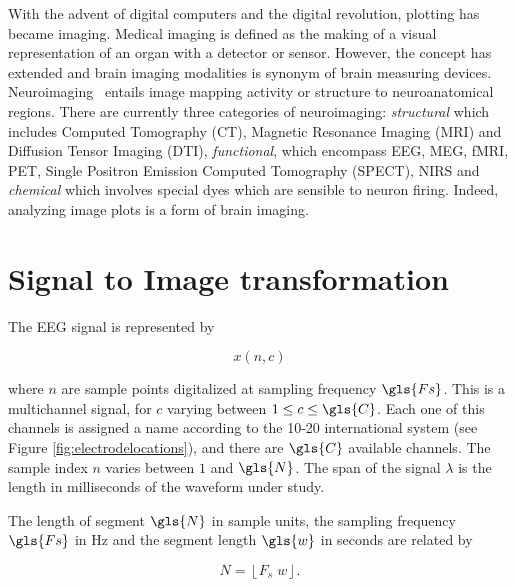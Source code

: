 
\begin{story}[Neuroimaging]
With the advent of digital computers and the digital revolution, plotting has became imaging.  Medical imaging is defined as the making of a visual representation of an organ with a detector or sensor.  However, the concept has extended and brain imaging modalities is  synonym of brain measuring devices.  Neuroimaging~\cite{Freeman2013} entails image mapping activity or structure to neuroanatomical regions.  There are currently three categories of neuroimaging: \textit{structural} which includes Computed Tomography (CT), Magnetic Resonance Imaging (MRI) and Diffusion Tensor Imaging (DTI), \textit{functional}, which encompass EEG, MEG, fMRI, PET, Single Positron Emission Computed Tomography (SPECT), NIRS and \textit{chemical} which involves special dyes which are sensible to neuron firing.  Indeed, analyzing image plots is a form of brain imaging.
\end{story}


\section{Signal to Image transformation}

The EEG signal is represented by

\begin{equation}
x(n,c)
\label{eq:eegdefinition}
\end{equation}

\noindent where $n$ are sample points digitalized at sampling frequency $\gls{Fs}$.  This is a multichannel signal, for $c$ varying between  $1 \leq c \leq \gls{C}$.  Each one of this channels is assigned a name according to the 10-20 international system (see Figure \ref{fig:electrodelocations}), and there are $\gls{C}$ available channels. The sample index $n$ varies between $1$ and $\gls{N}$.  The span of the signal $\lambda$ is the length in milliseconds of the waveform under study. 

The length of segment $\gls{N}$ in sample units, the sampling frequency $\gls{Fs}$ in \si{\hertz} and the segment length $\gls{w}$ in seconds are related by

\begin{equation}
N = \left\lfloor F_s \; w \right\rfloor.
\label{eq:segmentlength}
\end{equation}


